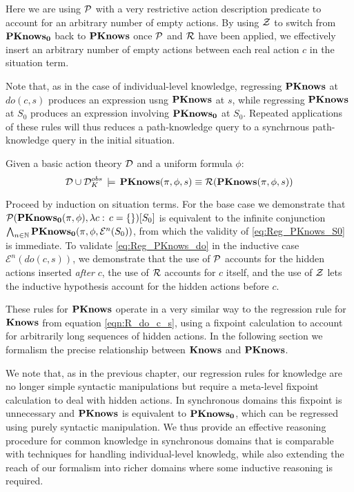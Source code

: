 Here we are using $\mathcal{P}$ with a very restrictive action description
predicate to account for an arbitrary number of empty actions. By
using $\mathcal{Z}$ to switch from $\mathbf{PKnows_{0}}$ back to $\mathbf{PKnows}$ once $\mathcal{P}$
and $\mathcal{R}$ have been applied, we effectively insert an arbitrary
number of empty actions between each real action $c$ in the situation
term.

Note that, as in the case of individual-level knowledge, regressing
$\mathbf{PKnows}$ at $do(c,s)$ produces an expression usng $\mathbf{PKnows}$ at
$s$, while regressing $\mathbf{PKnows}$ at $S_{0}$ produces an expression
involving $\mathbf{PKnows_{0}}$ at $S_{0}$. Repeated applications of these
rules will thus reduces a path-knowledge query to a synchrnous path-knowledge
query in the initial situation.

\begin{thm}
\label{thm:Reg_PKnows}Given a basic action theory $\mathcal{D}$ and a uniform
formula $\phi$:\[
\mathcal{D}\cup\mathcal{D}_{K}^{obs}\,\models\,\mathbf{PKnows}(\pi,\phi,s)\equiv\mathcal{R}(\mathbf{PKnows}(\pi,\phi,s))\]

\end{thm}
\begin{proofsketch}
Proceed by induction on situation terms. For the base case we demonstrate
that $\mathcal{P}(\mathbf{PKnows_{0}}(\pi,\phi),\lambda c:\, c=\{\})[S_{0}]$ is equivalent
to the infinite conjunction $\bigwedge_{n\in\mathbb{N}}\mathbf{PKnows_{0}}(\pi,\phi,\mathcal{E}^{n}(S_{0}))$,
from which the validity of \eqref{eq:Reg_PKnows_S0} is immediate.
To validate \eqref{eq:Reg_PKnows_do} in the inductive case $\mathcal{E}^{n}(do(c,s))$,
we demonstrate that the use of $\mathcal{P}$ accounts for the hidden actions
inserted \emph{after} $c$, the use of $\mathcal{R}$ accounts for $c$ itself,
and the use of $\mathcal{Z}$ lets the inductive hypothesis account for the
hidden actions before $c$. 
\end{proofsketch}
These rules for $\mathbf{PKnows}$ operate in a very similar way to the regression
rule for $\mathbf{Knows}$ from equation \eqref{eqn:R_do_c_s}, using a fixpoint
calculation to account for arbitrarily long sequences of hidden actions.
In the following section we formalism the precise relationship between
$\mathbf{Knows}$ and $\mathbf{PKnows}$.

We note that, as in the previous chapter, our regression rules for
knowledge are no longer simple syntactic manipulations but require
a meta-level fixpoint calculation to deal with hidden actions. In
synchronous domains this fixpoint is unnecessary and $\mathbf{PKnows}$ is
equivalent to $\mathbf{PKnows_{0}}$, which can be regressed using purely syntactic
manipulation. We thus provide an effective reasoning procedure for
common knowledge in synchronous domains that is comparable with techniques
for handling individual-level knowledg, while also extending the reach
of our formalism into richer domains where some inductive reasoning
is required.

